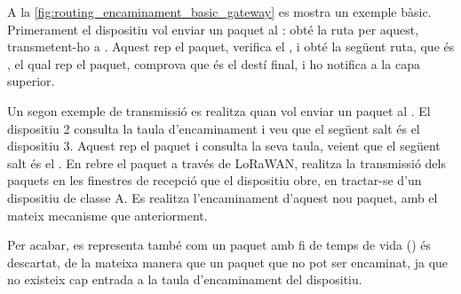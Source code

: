 \documentclass{tfgitic}[2024/07/01]
\begin{document}
{A la \autoref{fig:routing_encaminament_basic_gateway} es mostra un exemple bàsic. Primerament el dispositiu  vol enviar un paquet al : obté la ruta per aquest, transmetent-ho a . Aquest rep el paquet, verifica el , i obté la següent ruta, que és , el qual rep el paquet, comprova que és el destí final, i ho notifica a la capa superior. 

Un segon exemple de transmissió es realitza quan  vol enviar un paquet al . El dispositiu 2 consulta la taula d'encaminament i veu que el següent salt és el dispositiu 3. Aquest rep el paquet i consulta la seva taula, veient que el següent salt és el . En rebre el paquet a través de LoRaWAN, realitza la transmissió dels paquets en les finestres de recepció que el dispositiu  obre, en tractar-se d'un dispositiu de classe A. Es realitza l'encaminament d'aquest nou paquet, amb el mateix mecanisme que anteriorment.

Per acabar, es representa també com un paquet amb fi de temps de vida () és descartat, de la mateixa manera que un paquet que no pot ser encaminat, ja que no existeix cap entrada a la taula d'encaminament del dispositiu. 

\begin{figure}[h]
    \centering
\end{figure}}
\end{document}
